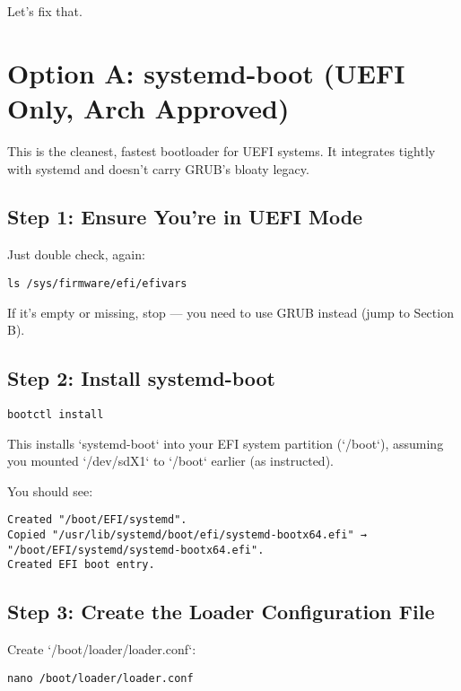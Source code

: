 \documentclass[12pt,openany]{book}
\begin{document}
Let’s fix that.

\section{Option A: systemd-boot (UEFI Only, Arch Approved)}

This is the cleanest, fastest bootloader for UEFI systems. It integrates tightly with systemd and doesn't carry GRUB’s bloaty legacy.

\subsection*{Step 1: Ensure You’re in UEFI Mode}

Just double check, again:

\begin{lstlisting}
ls /sys/firmware/efi/efivars
\end{lstlisting}

If it’s empty or missing, stop — you need to use GRUB instead (jump to Section B).

\subsection*{Step 2: Install systemd-boot}

\begin{lstlisting}
bootctl install
\end{lstlisting}

This installs `systemd-boot` into your EFI system partition (`/boot`), assuming you mounted `/dev/sdX1` to `/boot` earlier (as instructed).

You should see:

\begin{lstlisting}
Created "/boot/EFI/systemd".
Copied "/usr/lib/systemd/boot/efi/systemd-bootx64.efi" → "/boot/EFI/systemd/systemd-bootx64.efi".
Created EFI boot entry.
\end{lstlisting}

\subsection*{Step 3: Create the Loader Configuration File}

Create `/boot/loader/loader.conf`:

\begin{lstlisting}
nano /boot/loader/loader.conf
\end{lstlisting}
\end{document}
